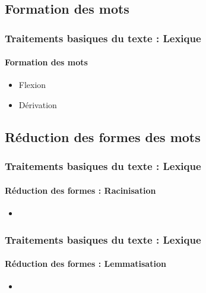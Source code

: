 \documentclass[xcolor=table]{beamer}
\begin{document}
\subsection{Formation des mots}

\begin{frame}
\frametitle{Traitements basiques du texte : Lexique}
\framesubtitle{Formation des mots}

\begin{itemize}
\item Flexion
\item Dérivation
\end{itemize}

\end{frame}

\subsection{Réduction des formes des mots}

\begin{frame}
\frametitle{Traitements basiques du texte : Lexique}
\framesubtitle{Réduction des formes : Racinisation}

\begin{itemize}
\item 
\end{itemize}

\end{frame}

\begin{frame}
\frametitle{Traitements basiques du texte : Lexique}
\framesubtitle{Réduction des formes : Lemmatisation}

\begin{itemize}
	\item 
\end{itemize}

\end{frame}

\end{document}
